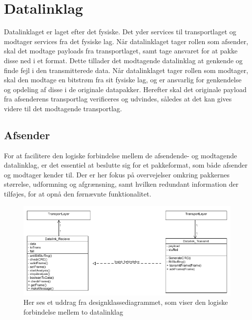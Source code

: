 \section{Datalinklag}
Datalinklaget er laget efter det fysiske. Det yder services til transportlaget og modtager services fra det fysiske lag.
Når datalinklaget tager rollen som afsender, skal det modtage payloads fra transportlaget, samt tage ansvaret for at pakke disse ned i et format.
Dette tillader det modtagende datalinklag at genkende og finde fejl i den transmitterede data.
Når datalinklaget tager rollen som modtager, skal den modtage en bitstrøm fra sit fysiske lag, og er ansvarlig for genkendelse og opdeling af disse i de originale datapakker.
Herefter skal det originale payload fra afsenderens transportlag verificeres og udvindes, således at det kan gives videre til det modtagende transportlag.

\subsection{Afsender}
For at facilitere den logiske forbindelse mellem de afsendende- og modtagende datalinklag, er det essentiel at beslutte sig for et pakkeformat, som både afsender og modtager kender til. Der er her fokus på overvejelser omkring pakkernes størrelse, udformning og afgrænsning, samt hvilken redundant information der tilføjes, for at opnå den førnævnte funktionalitet.

\begin{figure}[h!]
\centering
\includegraphics[scale=0.7]{Billeder/DataLinkLogical.PNG}
\caption{Her ses et uddrag fra designklassediagrammet, som viser den logiske forbindelse mellem to datalinklag}
\label{fig:DataLinkLogical}
\end{figure}

